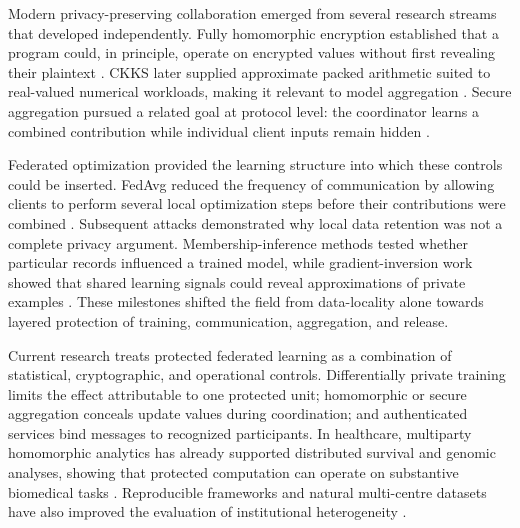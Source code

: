 
Modern privacy-preserving collaboration emerged from several research streams
that developed independently. Fully homomorphic encryption established that a
program could, in principle, operate on encrypted values without first revealing
their plaintext \cite{gentry2009fully}. CKKS later supplied approximate packed
arithmetic suited to real-valued numerical workloads, making it relevant to model
aggregation \cite{cheon2017homomorphic}. Secure aggregation pursued a related
goal at protocol level: the coordinator learns a combined contribution while
individual client inputs remain hidden \cite{bonawitz2017practical}.

Federated optimization provided the learning structure into which these controls
could be inserted. FedAvg reduced the frequency of communication by allowing
clients to perform several local optimization steps before their contributions
were combined \cite{mcmahan2017fedavg}. Subsequent attacks demonstrated why
local data retention was not a complete privacy argument. Membership-inference
methods tested whether particular records influenced a trained model, while
gradient-inversion work showed that shared learning signals could reveal
approximations of private examples \cite{shokri2017membership,zhu2019dlg,
geiping2020inverting}. These milestones shifted the field from data-locality alone
towards layered protection of training, communication, aggregation, and release.


Current research treats protected federated learning as a combination of
statistical, cryptographic, and operational controls. Differentially private
training limits the effect attributable to one protected unit; homomorphic or
secure aggregation conceals update values during coordination; and authenticated
services bind messages to recognized participants. In healthcare, multiparty
homomorphic analytics has already supported distributed survival and genomic
analyses, showing that protected computation can operate on substantive
biomedical tasks \cite{froelicher2021famh}. Reproducible frameworks and natural
multi-centre datasets have also improved the evaluation of institutional
heterogeneity \cite{ogier2022flamby,foley2022openfl}.


